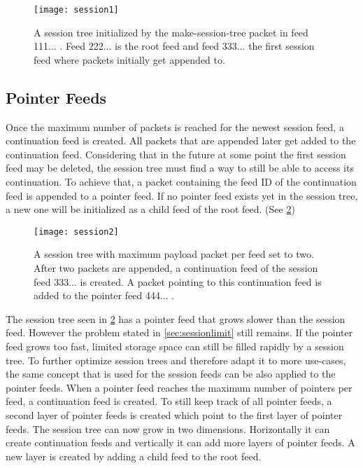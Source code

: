 \begin{figure}
\centering
\texttt{[image: session1]}
\caption{A session tree initialized by the make-session-tree packet in feed 111... . Feed 222... is the root feed and feed 333... the first session feed where packets initially get appended to.}
\label{fig:session1}
\end{figure}

\subsection{Pointer Feeds}
Once the maximum number of packets is reached for the newest session feed, a continuation feed is created. All packets that are appended later get added to the continuation feed. Considering that in the future at some point the first session feed may be deleted, the session tree must find a way to still be able to access its continuation. To achieve that, a packet containing the feed ID of the continuation feed is appended to a pointer feed. If no pointer feed exists yet in the session tree, a new one will be initialized as a child feed of the root feed. (See \cref{fig:session2})

\begin{figure}
\centering
\texttt{[image: session2]}
\caption{A session tree with maximum payload packet per feed set to two. After two packets are appended, a continuation feed of the session feed 333... is created. A packet pointing to this continuation feed is added to the pointer feed 444... .}
\label{fig:session2}
\end{figure}

The session tree seen in \cref{fig:session2} has a pointer feed that grows slower than the session feed. However the problem stated in \cref{sec:sessionlimit} still remains. If the pointer feed grows too fast, limited storage space can still be filled rapidly by a session tree. To further optimize session trees and therefore adapt it to more use-cases, the same concept that is used for the session feeds can be also applied to the pointer feeds. When a pointer feed reaches the maximum number of pointers per feed, a continuation feed is created. To still keep track of all pointer feeds, a second layer of pointer feeds is created which point to the first layer of pointer feeds. The session tree can now grow in two dimensions. Horizontally it can create continuation feeds and vertically it can add more layers of pointer feeds. A new layer is created by adding a child feed to the root feed.

